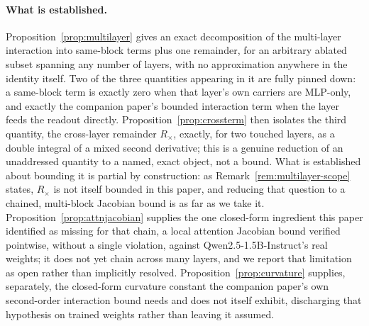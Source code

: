 \documentclass[11pt,a4paper]{article}
\begin{document}
\paragraph{What is established.} Proposition~\ref{prop:multilayer} gives an
exact decomposition of the multi-layer interaction into same-block terms
plus one remainder, for an arbitrary ablated subset spanning any number of
layers, with no approximation anywhere in the identity itself. Two of the
three quantities appearing in it are fully pinned down: a same-block term is
exactly zero when that layer's own carriers are MLP-only, and exactly the
companion paper's bounded interaction term when the layer feeds the readout
directly. Proposition~\ref{prop:crossterm} then isolates the third quantity,
the cross-layer remainder $R_\times$, exactly, for two touched layers, as a
double integral of a mixed second derivative; this is a genuine reduction of
an unaddressed quantity to a named, exact object, not a bound. What is
established about bounding it is partial by construction: as
Remark~\ref{rem:multilayer-scope} states, $R_\times$ is not itself bounded
in this paper, and reducing that question to a chained, multi-block Jacobian
bound is as far as we take it. Proposition~\ref{prop:attnjacobian} supplies
the one closed-form ingredient this paper identified as missing for that
chain, a local attention Jacobian bound verified pointwise, without a single
violation, against Qwen2.5-1.5B-Instruct's real weights; it does not yet
chain across many layers, and we report that limitation as open rather than
implicitly resolved. Proposition~\ref{prop:curvature} supplies, separately,
the closed-form curvature constant the companion paper's own second-order
interaction bound needs and does not itself exhibit, discharging that
hypothesis on trained weights rather than leaving it assumed.
\end{document}
